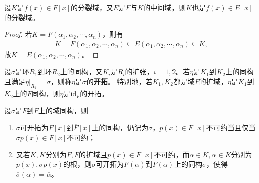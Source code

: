 \documentclass[../../main.tex]{subfiles}%
\begin{document}
\begin{corollary}
设$K$是$f(x)\in F[x]$的分裂域，又$E$是$F$与$K$的中间域，则$K$也是$f(x)\in E[x]$的分裂域。
\end{corollary}

\begin{proof}
若$K=F(\alpha_1,\alpha_2,\cdots,\alpha_n)$，则有
\begin{align*}
K=F(\alpha_1,\alpha_2,\cdots,\alpha_n)\subseteq E(\alpha_1,\alpha_2,\cdots,\alpha_n)\subseteq K,
\end{align*}
故$K=E(\alpha_1,\alpha_2,\cdots,\alpha_n)$。
\end{proof}

\begin{definition}
设$\sigma$是环$R_1$到环$R_2$上的同构，又$K_i$是$R_i$的扩张，$i=1,2$。若$\eta$是$K_1$到$K_2$上的同构且满足$\eta|_{R_1}=\sigma$，则称$\eta$是$\sigma$的\textbf{开拓}。
特别地，若$K_1,K_2$都是域$F$的扩域，$\eta$是$K_1$到$K_2$上的$F$同构，则$\eta$是$\mathrm{id}_F$的开拓。
\end{definition}

\begin{theorem}
设$\sigma$是$F$到$\overline{F}$上的域同构，则
\begin{enumerate}[(1)]
\item $\sigma$可开拓为$F[x]$到$\overline{F}[x]$上的同构，仍记为$\sigma$，$p(x)\in F[x]$不可约当且仅当$\sigma p(x)\in\overline{F}[x]$不可约；
\item 又若$K,\overline{K}$分别为$F,\overline{F}$的扩域且$p(x)\in F[x]$不可约，而$\alpha\in K,\overline{\alpha}\in\overline{K}$分别为$p(x),\sigma p(x)$的根，则$\sigma$可开拓为$F(\alpha)$到$\overline{F}(\overline{\alpha})$上的同构$\overline{\sigma}$，使得$\overline{\sigma}(\alpha)=\overline{\alpha}$。
\end{enumerate}
\end{theorem}
\end{document}
